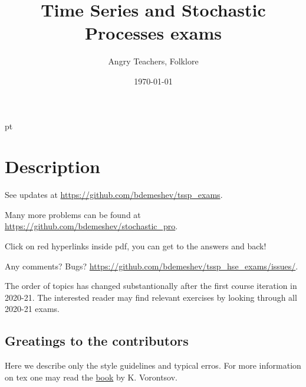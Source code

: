 \documentclass[11pt, a4paper]{article}
\title{Time Series and Stochastic Processes exams}
\date{\today}
\author{Angry Teachers, Folklore}
\theoremstyle{definition}
\begin{document}
\maketitle

\tableofcontents{}


 pt %

\clearpage
\section*{Description}

See updates at \url{https://github.com/bdemeshev/tssp_exams}.

Many more problems can be found at  \url{https://github.com/bdemeshev/stochastic_pro}.

Click on red hyperlinks inside pdf, you can get to the answers and back!


Any comments? Bugs?
\url{https://github.com/bdemeshev/tssp_hse_exams/issues/}.

The order of topics has changed substantionally after the first course iteration in 2020-21.
The interested reader may find relevant exercises by looking through all 2020-21 exams. 


\subsection*{Greatings to the contributors}

Here we describe only the style guidelines and typical erros. 
For more information on tex one may read the 
\href{http://www.ccas.ru/voron/download/voron05latex.pdf}{book} by K. Vorontsov.
\end{document}
